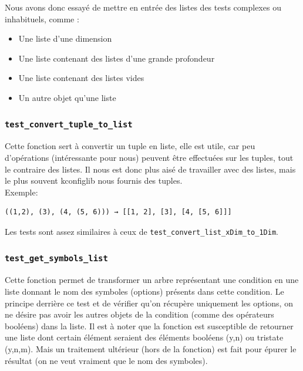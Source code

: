 \documentclass[16pts]{report}
\begin{document}
Nous avons donc essayé de mettre en entrée des listes des tests complexes ou
inhabituels, comme : \\

\begin{itemize}
    \item Une liste d’une dimension
    \item Une liste contenant des listes d'une grande profondeur
    \item Une liste contenant des listes vides
    \item Un autre objet qu'une liste
\end{itemize}

\subsubsection{\texttt{test\_convert\_tuple\_to\_list}}

Cette fonction sert à convertir un tuple en liste, elle est utile, car peu
d'opérations (intéressante pour nous) peuvent être effectuées sur les tuples,
tout le contraire des listes. Il nous est donc plus aisé de travailler avec des
listes, mais le plus souvent kconfiglib nous fournis des tuples.
\\
Exemple:
\begin{verbatim}
((1,2), (3), (4, (5, 6))) → [[1, 2], [3], [4, [5, 6]]]
\end{verbatim}

Les tests sont assez similaires à ceux de \verb|test_convert_list_xDim_to_1Dim|. \\


\subsubsection{\texttt{test\_get\_symbols\_list}}

Cette fonction permet de transformer un arbre représentant une condition en une
liste donnant le nom des symboles (options) présents dans cette condition. Le
principe derrière ce test et de vérifier qu'on récupère uniquement les options,
on ne désire pas avoir les autres objets de la condition (comme des opérateurs
booléens) dans la liste.  Il est à noter que la fonction est susceptible de
retourner une liste dont certain élément seraient des éléments booléens (y,n)
ou tristate (y,n,m).  Mais un traitement ultérieur (hors de la fonction) est
fait pour épurer le résultat (on ne veut vraiment que le nom des symboles).\\
\end{document}
